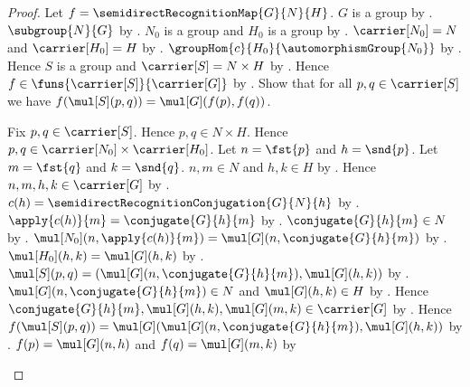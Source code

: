 \begin{proof}
    Let $f=\semidirectRecognitionMap{G}{N}{H}$.
    $G$ is a group by .
    $\subgroup{N}{G}$ by .
    $N_0$ is a group and $H_0$ is a group by
        .
    $\carrier[N_0]=N$ and $\carrier[H_0]=H$ by
        .
    $\groupHom{c}{H_0}{\automorphismGroup{N_0}}$ by
        .
    Hence $S$ is a group and $\carrier[S]=N\times H$ by
        .
    Hence $f\in\funs{\carrier[S]}{\carrier[G]}$ by
        .
    Show that for all $p,q\in\carrier[S]$ we have
        $f(\mul[S](p,q))=\mul[G](f(p),f(q))$.
    \begin{subproof}
        Fix $p,q\in\carrier[S]$.
        Hence $p,q\in N\times H$.
        Hence $p,q\in\carrier[N_0]\times\carrier[H_0]$.
        Let $n=\fst{p}$ and $h=\snd{p}$.
        Let $m=\fst{q}$ and $k=\snd{q}$.
        $n,m\in N$ and $h,k\in H$ by
            .
        Hence $n,m,h,k\in\carrier[G]$ by
            .
        $c(h)=\semidirectRecognitionConjugation{G}{N}{h}$ by
            .
        $\apply{c(h)}{m}=\conjugate{G}{h}{m}$ by
            .
        $\conjugate{G}{h}{m}\in N$ by
            .
        $\mul[N_0](n,\apply{c(h)}{m})=
            \mul[G](n,\conjugate{G}{h}{m})$ by
            .
        $\mul[H_0](h,k)=\mul[G](h,k)$ by
            .
        $\mul[S](p,q)=
            (\mul[G](n,\conjugate{G}{h}{m}),\mul[G](h,k))$ by
            .
        $\mul[G](n,\conjugate{G}{h}{m})\in N$ and
            $\mul[G](h,k)\in H$ by .
        Hence $\conjugate{G}{h}{m},\mul[G](h,k),
            \mul[G](m,k)\in\carrier[G]$ by
            .
        Hence
            $f(\mul[S](p,q))=
                \mul[G]
                    (\mul[G](n,\conjugate{G}{h}{m}),
                     \mul[G](h,k))$ by
            .
        $f(p)=\mul[G](n,h)$ and $f(q)=\mul[G](m,k)$ by

\end{subproof}
\end{proof}
